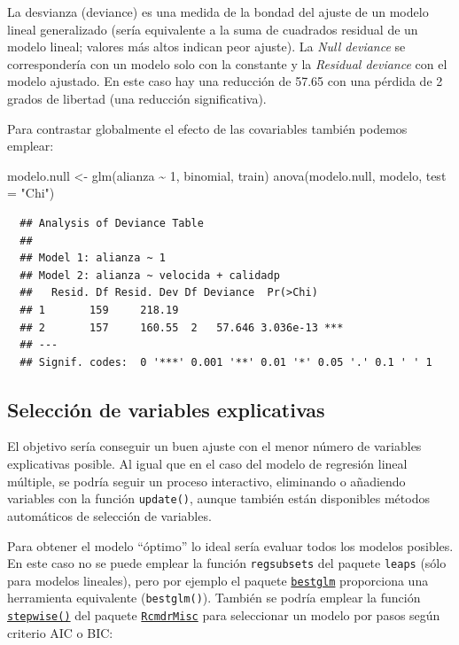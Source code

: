 \documentclass[
]{book}
\newenvironment{Shaded}{\begin{snugshade}}{\end{snugshade}}
\newcommand{\AttributeTok}[1]{\textcolor[rgb]{0.77,0.63,0.00}{#1}}
\newcommand{\DecValTok}[1]{\textcolor[rgb]{0.00,0.00,0.81}{#1}}
\newcommand{\FunctionTok}[1]{\textcolor[rgb]{0.00,0.00,0.00}{#1}}
\newcommand{\NormalTok}[1]{#1}
\newcommand{\OtherTok}[1]{\textcolor[rgb]{0.56,0.35,0.01}{#1}}
\newcommand{\SpecialCharTok}[1]{\textcolor[rgb]{0.00,0.00,0.00}{#1}}
\newcommand{\StringTok}[1]{\textcolor[rgb]{0.31,0.60,0.02}{#1}}
\theoremstyle{break}
\theoremstyle{nonumberplain}
\begin{document}
La desvianza (deviance) es una medida de la bondad del ajuste de un modelo lineal generalizado (sería equivalente a la suma de cuadrados residual de un modelo lineal; valores más altos indican peor ajuste).
La \emph{Null deviance} se correspondería con un modelo solo con la constante y la \emph{Residual deviance} con el modelo ajustado.
En este caso hay una reducción de 57.65 con una pérdida de 2 grados de libertad (una reducción significativa).

Para contrastar globalmente el efecto de las covariables también podemos emplear:

\begin{Shaded}
\begin{Highlighting}[]
\NormalTok{modelo.null }\OtherTok{\textless{}{-}} \FunctionTok{glm}\NormalTok{(alianza }\SpecialCharTok{\textasciitilde{}} \DecValTok{1}\NormalTok{, binomial, train)}
\FunctionTok{anova}\NormalTok{(modelo.null, modelo, }\AttributeTok{test =} \StringTok{"Chi"}\NormalTok{)}
\end{Highlighting}
\end{Shaded}

\begin{verbatim}
  ## Analysis of Deviance Table
  ## 
  ## Model 1: alianza ~ 1
  ## Model 2: alianza ~ velocida + calidadp
  ##   Resid. Df Resid. Dev Df Deviance  Pr(>Chi)    
  ## 1       159     218.19                          
  ## 2       157     160.55  2   57.646 3.036e-13 ***
  ## ---
  ## Signif. codes:  0 '***' 0.001 '**' 0.01 '*' 0.05 '.' 0.1 ' ' 1
\end{verbatim}

\hypertarget{selecciuxf3n-de-variables-explicativas}{%
\subsection{Selección de variables explicativas}\label{selecciuxf3n-de-variables-explicativas}}

El objetivo sería conseguir un buen ajuste con el menor número de variables explicativas posible.
Al igual que en el caso del modelo de regresión lineal múltiple, se podría seguir un proceso interactivo, eliminando o añadiendo variables con la función \texttt{update()}, aunque también están disponibles métodos automáticos de selección de variables.

Para obtener el modelo ``óptimo'' lo ideal sería evaluar todos los modelos posibles.
En este caso no se puede emplear la función \texttt{regsubsets} del paquete \texttt{leaps} (sólo para modelos lineales),
pero por ejemplo el paquete
\href{https://cran.r-project.org/web/packages/bestglm/vignettes/bestglm.pdf}{\texttt{bestglm}}
proporciona una herramienta equivalente (\texttt{bestglm()}).
También se podría emplear la función \href{https://rdrr.io/pkg/RcmdrMisc/man/stepwise.html}{\texttt{stepwise()}} del paquete \href{https://CRAN.R-project.org/package=RcmdrMisc}{\texttt{RcmdrMisc}} para seleccionar un modelo por pasos según criterio AIC o BIC:
\end{document}
